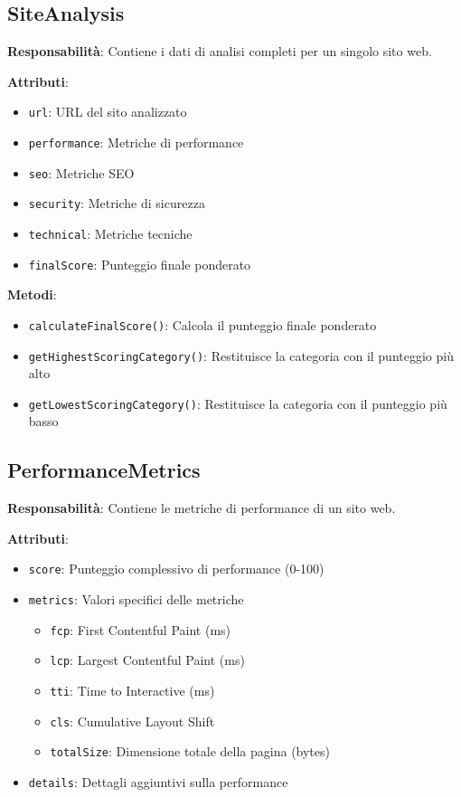 {{{{{{{\subsection{SiteAnalysis}
\textbf{Responsabilità}: Contiene i dati di analisi completi per un singolo sito web.

\textbf{Attributi}:
\begin{itemize}
    \item \texttt{url}: URL del sito analizzato
    \item \texttt{performance}: Metriche di performance
    \item \texttt{seo}: Metriche SEO
    \item \texttt{security}: Metriche di sicurezza
    \item \texttt{technical}: Metriche tecniche
    \item \texttt{finalScore}: Punteggio finale ponderato
\end{itemize}

\textbf{Metodi}:
\begin{itemize}
    \item \texttt{calculateFinalScore()}: Calcola il punteggio finale ponderato
    \item \texttt{getHighestScoringCategory()}: Restituisce la categoria con il punteggio più alto
    \item \texttt{getLowestScoringCategory()}: Restituisce la categoria con il punteggio più basso
\end{itemize}

\subsection{PerformanceMetrics}
\textbf{Responsabilità}: Contiene le metriche di performance di un sito web.

\textbf{Attributi}:
\begin{itemize}
    \item \texttt{score}: Punteggio complessivo di performance (0-100)
    \item \texttt{metrics}: Valori specifici delle metriche
    \begin{itemize}
        \item \texttt{fcp}: First Contentful Paint (ms)
        \item \texttt{lcp}: Largest Contentful Paint (ms)
        \item \texttt{tti}: Time to Interactive (ms)
        \item \texttt{cls}: Cumulative Layout Shift
        \item \texttt{totalSize}: Dimensione totale della pagina (bytes)
    \end{itemize}
    \item \texttt{details}: Dettagli aggiuntivi sulla performance
\end{itemize}

}}}}}}}

